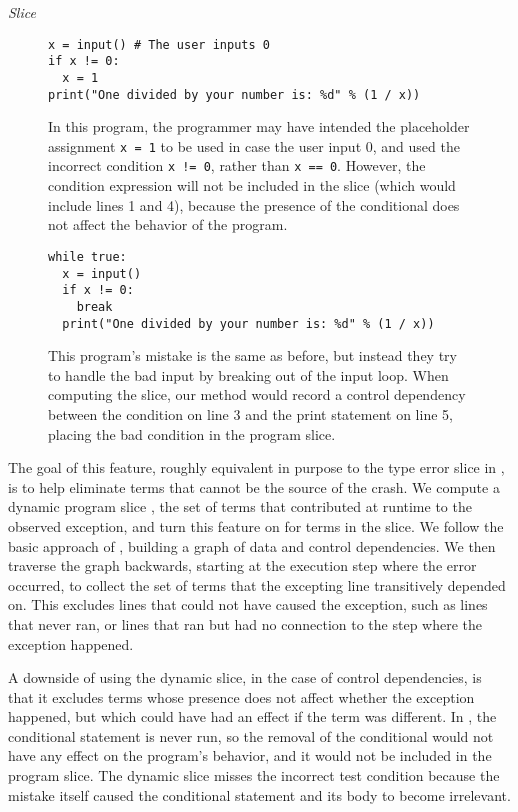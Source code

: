 \documentclass[conference]{IEEEtran}
\begin{document}
\emph{Slice}
\begin{figure}
\begin{lstlisting}
x = input() # The user inputs 0
if x != 0:
  x = 1
print("One divided by your number is: %d" % (1 / x))
\end{lstlisting}
\caption{In this program, the programmer may have intended the placeholder
  assignment \texttt{x = 1} to be used in case the user input 0, and used the
  incorrect condition \texttt{x != 0}, rather than \texttt{x == 0}. However, the
  condition expression will not be included in the slice (which would include
  lines 1 and 4), because the presence of
  the conditional does not affect the behavior of the program.
}
\label{slice-downside-example}
\end{figure}

\begin{figure}
\begin{lstlisting}
while true:
  x = input()
  if x != 0:
    break
  print("One divided by your number is: %d" % (1 / x))
\end{lstlisting}
\caption{
  This program's mistake is the same as before,
  but instead they try to handle the
  bad input by breaking out of the input loop. When computing the slice, our
  method would record a control dependency between the condition on line 3 and
  the print statement on line 5, placing the bad condition in the program slice.
}
\label{early-break}
\end{figure}

The goal of this feature, roughly equivalent in purpose to the type error slice in
\cite {learning-to-blame}, is to help eliminate terms that cannot be the source of
the crash. We compute a dynamic program slice \cite{KOREL1988155}, the set of
terms that contributed at runtime to the observed exception, and turn this
feature on for terms in the slice. We follow the basic approach of
\cite{KOREL1988155, KOREL1990187}, building a graph of data and control
dependencies. We then traverse the graph backwards, starting at the execution
step where the error occurred, to collect the set of terms that the excepting
line transitively depended on. This excludes lines that could not have caused the
exception, such as lines that never ran, or lines that ran but had no connection
to the step where the exception happened.

A downside of using the dynamic slice, in the case of control dependencies, is
that it excludes terms whose presence does not affect whether the exception
happened, but which could have had an effect if the term was different. In
, the conditional statement is never run, so the
removal of the conditional would not have any effect on the program's behavior,
and it would not be included in the program slice. The dynamic slice misses the
incorrect test condition because the mistake itself caused the conditional
statement and its body to become irrelevant.
\end{document}
